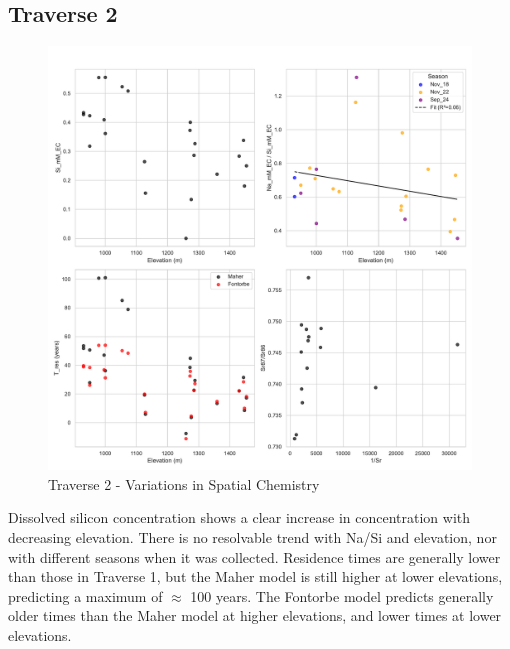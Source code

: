\newpage

\subsection{Traverse 2}

\begin{figure}[h]
    \centering
        \includegraphics[width=\textwidth]{Traverse_2_summary.pdf}
    \caption{Traverse 2 - Variations in Spatial Chemistry}
    \label{fig:spatial_changes_spring2}
\end{figure}

\FloatBarrier

Dissolved silicon concentration shows a clear increase in concentration with decreasing elevation. There is no resolvable trend with Na/Si and elevation, nor with different seasons when it was collected. Residence times are generally lower than those in Traverse 1, but the Maher model is still higher at lower elevations, predicting a maximum of $\approx$ 100 years. The Fontorbe model predicts generally older times than the Maher model at higher elevations, and lower times at lower elevations. 





